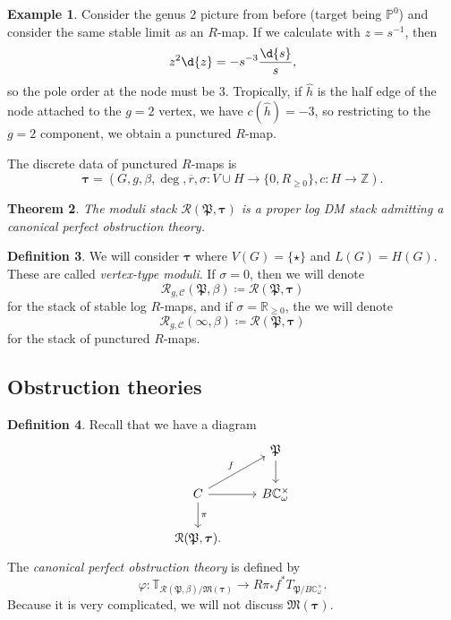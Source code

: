 \documentclass[10pt]{amsart}
\newtheorem{thm}{Theorem}[section]
\theoremstyle{definition}
\newtheorem{defn}[thm]{Definition}
\newtheorem{exm}[thm]{Example}
\theoremstyle{remark}
\theoremstyle{plain}
\theoremstyle{definition}
\theoremstyle{remark}
\newcommand{\R}{\mathbb{R}}
\newcommand{\C}{\mathbb{C}}
\newcommand{\Z}{\mathbb{Z}}
\renewcommand{\P}{\mathbb{P}}
\newcommand{\mc}[1]{\mathcal{#1}}
\newcommand{\mf}[1]{\mathfrak{#1}}
\newcommand{\btau}{\bm{\tau}}
\newcommand{\ol}[1]{\overline{#1}}
\newcommand{\1}{\mathbf{1}}
\newcommand{\2}{\mathbf{2}}
\newcommand{\3}{\mathbf{3}}
\begin{document}
\begin{exm}
    Consider the genus $2$ picture from before (target being $\P^0$) and consider the same stable limit as an $R$-map. If we calculate with $z = s^{-1}$, then
    \[ z^2 \d{z} = -s^{-3} \frac{\d{s}}{s}, \]
    so the pole order at the node must be $3$. Tropically, if $\hat{h}$ is the half edge of the node attached to the $g=2$ vertex, we have $c(\hat{h}) = -3$, so restricting to the $g=2$ component, we obtain a punctured $R$-map.
\end{exm}

The discrete data of punctured $R$-maps is
\[ \bm{\tau} = (G, g, \beta, \deg, \ol{r}, \sigma\colon V \cup H \to \{0,R_{\geq 0}\}, c \colon H \to \Z). \]

\begin{thm}
    The moduli stack $\mc{R}(\mf{P}, \bm{\tau})$ is a proper log DM stack admitting a canonical perfect obstruction theory.
\end{thm}


\begin{defn}
    We will consider $\bm{\tau}$ where $V(G) = \{\star\}$ and $L(G) = H(G)$. These are called \textit{vertex-type moduli}. If $\sigma = 0$, then we will denote
    \[ \mc{R}_{g,\mc{C}}(\mf{P}, \beta) \coloneqq \mc{R}(\mf{P}, \bm{\tau}) \]
    for the stack of stable log $R$-maps,
    and if $\sigma = \R_{\geq 0}$, the we will denote
    \[ \mc{R}_{g,\mc{C}}(\infty, \beta) \coloneqq \mc{R}(\mf{P}, \btau) \]
    for the stack of punctured $R$-maps.
\end{defn}

\subsection{Obstruction theories}%
\label{sub:The canonical perfect obstruction theory}


\begin{defn}
    Recall that we have a diagram
    \begin{equation*}
    \begin{tikzcd}
        & \mf{P} \ar{d} \\
        C \ar{r} \ar{d}{\pi} \ar{ur}{f} & B \C_{\omega}^{\times} \\
        \mc{R}(\mf{P}, \btau).
    \end{tikzcd}
    \end{equation*}
    The \textit{canonical perfect obstruction theory} is defined by
    \[ \varphi \colon \mathbb{T}_{\mc{R}(\mf{P}, \beta)/\mf{M}(\btau)} \to R \pi_* f^* T_{\mf{P}/B\C_{\omega}^{\times}}. \]
    Because it is very complicated, we will not discuss $\mf{M}(\btau)$.
\end{defn}
\end{document}
